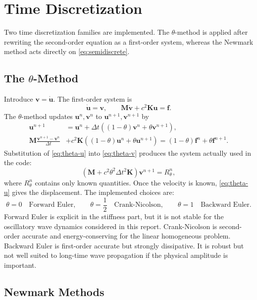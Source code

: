 \documentclass[11pt,a4paper]{article}
\newcommand{\dt}{\Delta t}
\newcommand{\Uh}{\mathbf{u}}
\newcommand{\Vh}{\mathbf{v}}
\newcommand{\M}{\mathbf{M}}
\newcommand{\K}{\mathbf{K}}
\newcommand{\F}{\mathbf{f}}
\begin{document}
\section{Time Discretization}

Two time discretization families are implemented.  The $\theta$-method is
applied after rewriting the second-order equation as a first-order system,
whereas the Newmark method acts directly on \eqref{eq:semidiscrete}.

\subsection{The $\theta$-Method}

Introduce $\Vh=\dot{\Uh}$.  The first-order system is
\begin{equation}
\dot{\Uh}=\Vh,\qquad
\M\dot{\Vh}+c^2\K\Uh=\F.
\end{equation}
The $\theta$-method updates $\Uh^n,\Vh^n$ to $\Uh^{n+1},\Vh^{n+1}$ by
\begin{align}
\Uh^{n+1} &= \Uh^n+\dt\left((1-\theta)\Vh^n+\theta\Vh^{n+1}\right),
\label{eq:theta-u}\\
\M\frac{\Vh^{n+1}-\Vh^n}{\dt}
&+c^2\K\left((1-\theta)\Uh^n+\theta\Uh^{n+1}\right)
=(1-\theta)\F^n+\theta\F^{n+1}.
\label{eq:theta-v}
\end{align}
Substitution of \eqref{eq:theta-u} into \eqref{eq:theta-v} produces the system
actually used in the code:
\begin{equation}
\left(\M+c^2\theta^2\dt^2\K\right)\Vh^{n+1}=R_\theta^n,
\label{eq:theta-system}
\end{equation}
where $R_\theta^n$ contains only known quantities.  Once the velocity is known,
\eqref{eq:theta-u} gives the displacement.  The implemented choices are:
\[
\theta=0 \quad\text{Forward Euler},\qquad
\theta=\frac12 \quad\text{Crank-Nicolson},\qquad
\theta=1 \quad\text{Backward Euler}.
\]
Forward Euler is explicit in the stiffness part, but it is not stable for the
oscillatory wave dynamics considered in this report.
Crank-Nicolson is second-order accurate and energy-conserving for the linear
homogeneous problem.  Backward Euler is first-order accurate but strongly
dissipative. It is robust but not well suited to long-time wave propagation if
the physical amplitude is important.

\subsection{Newmark Methods}
\end{document}
